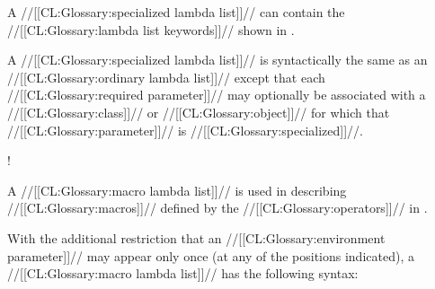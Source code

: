  

A //[[CL:Glossary:specialized lambda list]]// can contain the //[[CL:Glossary:lambda list keywords]]// shown in \thenextfigure.


A //[[CL:Glossary:specialized lambda list]]// is syntactically the same as an //[[CL:Glossary:ordinary lambda list]]// except that each //[[CL:Glossary:required parameter]]// may optionally be associated with a //[[CL:Glossary:class]]// or //[[CL:Glossary:object]]// for which that //[[CL:Glossary:parameter]]// is //[[CL:Glossary:specialized]]//.

\Vskip 1pc! 

\endsubSection%

 

A //[[CL:Glossary:macro lambda list]]// is used in describing //[[CL:Glossary:macros]]//  defined by the //[[CL:Glossary:operators]]// in \thenextfigure.


With the additional restriction that an //[[CL:Glossary:environment parameter]]// may appear only once (at any of the positions indicated), a //[[CL:Glossary:macro lambda list]]// has the following syntax:

